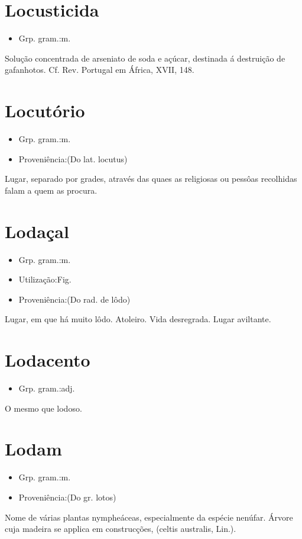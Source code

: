 \section{Locusticida}
\begin{itemize}
\item {Grp. gram.:m.}
\end{itemize}
Solução concentrada de arseniato de soda e açúcar, destinada á destruição de gafanhotos. Cf. Rev. \textunderscore Portugal em África\textunderscore , XVII, 148.
\section{Locutório}
\begin{itemize}
\item {Grp. gram.:m.}
\end{itemize}
\begin{itemize}
\item {Proveniência:(Do lat. \textunderscore locutus\textunderscore )}
\end{itemize}
Lugar, separado por grades, através das quaes as religiosas ou pessôas recolhidas falam a quem as procura.
\section{Lodaçal}
\begin{itemize}
\item {Grp. gram.:m.}
\end{itemize}
\begin{itemize}
\item {Utilização:Fig.}
\end{itemize}
\begin{itemize}
\item {Proveniência:(Do rad. de \textunderscore lôdo\textunderscore )}
\end{itemize}
Lugar, em que há muito lôdo.
Atoleiro.
Vida desregrada.
Lugar aviltante.
\section{Lodacento}
\begin{itemize}
\item {Grp. gram.:adj.}
\end{itemize}
O mesmo que \textunderscore lodoso\textunderscore .
\section{Lodam}
\begin{itemize}
\item {Grp. gram.:m.}
\end{itemize}
\begin{itemize}
\item {Proveniência:(Do gr. \textunderscore lotos\textunderscore )}
\end{itemize}
Nome de várias plantas nympheáceas, especialmente da espécie nenúfar.
Árvore cuja madeira se applica em construcções, (\textunderscore celtis australis\textunderscore , Lin.).
